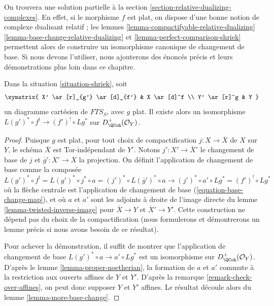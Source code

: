 \medskip\noindent
On trouvera une solution partielle à la section \ref{section-relative-dualizing-complexes}. En effet, si le morphisme $f$ est plat, on dispose d'une bonne notion de complexe dualisant relatif ; les lemmes \ref{lemma-compactifyable-relative-dualizing} \ref{lemma-base-change-relative-dualizing} et \ref{lemma-perfect-comparison-shriek} permettent alors de construire un isomorphisme canonique de changement de base. Si nous devons l'utiliser, nous ajouterons des énoncés précis et leurs démonstrations plus loin dans ce chapitre.

\begin{lemma}
\label{lemma-base-change-shriek-flat}
Dans la situation \ref{situation-shriek}, soit
$$
\xymatrix{
X' \ar[r]_{g'} \ar[d]_{f'} & X \ar[d]^f \\
Y' \ar[r]^g & Y
}
$$
un diagramme cartésien de $\textit{FTS}_S$, avec $g$ plat. Il existe alors un isomorphisme $L(g')^* \circ f^! \to (f')^! \circ Lg^*$ sur $D_\QCoh^+(\mathcal{O}_Y)$.
\end{lemma}

\begin{proof}
Puisque $g$ est plat, pour tout choix de compactification $j : X \to \overline{X}$ de $X$ sur $Y$, le schéma $\overline{X}$ est Tor-indépendant de $Y'$. Notons $j' : X' \to \overline{X}'$ le changement de base de $j$ et $\overline{g}' : \overline{X}' \to \overline{X}$ la projection. On définit l'application de changement de base comme la composée
$$
L(g')^* \circ f^! = L(g')^* \circ j^* \circ a =
(j')^* \circ L(\overline{g}')^* \circ a \longrightarrow
(j')^* \circ a' \circ Lg^* = (f')^! \circ Lg^*
$$
où la flèche centrale est l'application de changement de base (\ref{equation-base-change-map}), et où $a$ et $a'$ sont les adjoints à droite de l'image directe du lemme \ref{lemma-twisted-inverse-image} pour $\overline{X} \to Y$ et $\overline{X}' \to Y'$. Cette construction ne dépend pas du choix de la compactification (nous formulerons et démontrerons un lemme précis si nous avons besoin de ce résultat).

\medskip\noindent
Pour achever la démonstration, il suffit de montrer que l'application de changement de base $L(g')^* \circ a \to a' \circ Lg^*$ est un isomorphisme sur $D_\QCoh^+(\mathcal{O}_Y)$. D'après le lemme \ref{lemma-proper-noetherian}, la formation de $a$ et $a'$ commute à la restriction aux ouverts affines de $Y$ et $Y'$. D'après la remarque \ref{remark-check-over-affines}, on peut donc supposer $Y$ et $Y'$ affines. Le résultat découle alors du lemme \ref{lemma-more-base-change}.
\end{proof}


